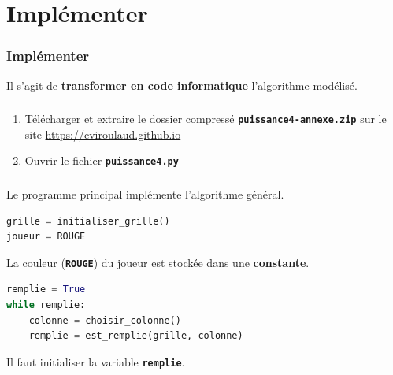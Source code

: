 \documentclass[svgnames,11pt]{beamer}
\begin{document}
\section{Implémenter}
\begin{frame}
    \frametitle{Implémenter}

    \begin{aretenir}[]
    Il s'agit de \textbf{transformer en code informatique} l'algorithme modélisé.
    \end{aretenir}

\end{frame}
\begin{frame}
    \frametitle{}

    \begin{activite}
    \begin{enumerate}
        \item Télécharger et extraire le dossier compressé \textbf{\texttt{puissance4-annexe.zip}} sur le site \url{https://cviroulaud.github.io}
        \item Ouvrir le fichier \textbf{\texttt{puissance4.py}}
    \end{enumerate}
    \end{activite}

\end{frame}
\begin{frame}
    \frametitle{}

    Le programme principal implémente l'algorithme général.

\end{frame}
\begin{frame}[fragile]

    \begin{center}
    \begin{lstlisting}[language=Python , basicstyle=\ttfamily\small, xleftmargin=2em, xrightmargin=2em]
grille = initialiser_grille()
joueur = ROUGE
\end{lstlisting}
    \end{center}
\begin{aretenir}[Remarque]
La couleur (\textbf{\texttt{ROUGE}}) du joueur est stockée dans une \textbf{constante}.
\end{aretenir}
\end{frame}
\begin{frame}[fragile]

    \begin{center}
    \begin{lstlisting}[language=Python , basicstyle=\ttfamily\small, xleftmargin=2em, xrightmargin=2em]
remplie = True
while remplie:
    colonne = choisir_colonne()
    remplie = est_remplie(grille, colonne)
\end{lstlisting}
    \end{center}
\begin{aretenir}[Remarque]
Il faut initialiser la variable \textbf{\texttt{remplie}}.
\end{aretenir}
\end{frame}
\end{document}
